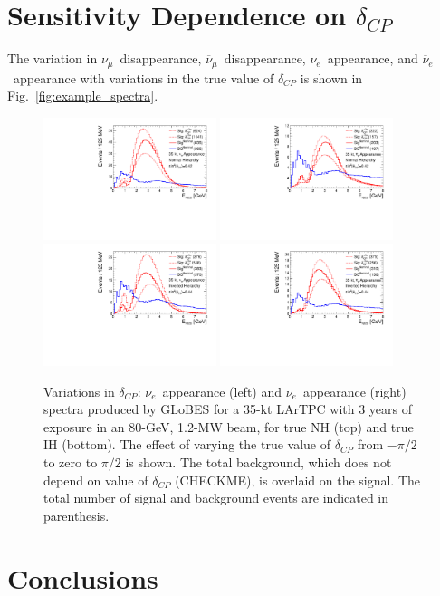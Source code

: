 \documentclass[letterpaper,11pt]{article}
\begin{document}
\section{Sensitivity Dependence on $\delta_{CP}$}
\label{sect:deltacp}
The variation in $\nu_{\mu}$~disappearance, $\overline{\nu}_{\mu}$~disappearance, 
$\nu_e$~appearance, and $\overline{\nu}_e$~appearance with variations in the true
value of $\delta_{CP}$ is shown in Fig.~\ref{fig:example_spectra}.
\begin{figure}[!htb]
  \centering
  \includegraphics[width=0.45\textwidth]{figs/spectra_35kt_nue_dcpvar_nh.pdf}
  \includegraphics[width=0.45\textwidth]{figs/spectra_35kt_nuebar_dcpvar_nh.pdf}
  \includegraphics[width=0.45\textwidth]{figs/spectra_35kt_nue_dcpvar_ih.pdf}
  \includegraphics[width=0.45\textwidth]{figs/spectra_35kt_nuebar_dcpvar_ih.pdf}
  \caption{
  Variations in $\delta_{CP}$:
  $\nu_e$~appearance (left) and $\overline{\nu}_e$~appearance (right) spectra 
  produced by GLoBES for a 35-kt LArTPC with 3 years of 
  exposure in an 80-GeV, 1.2-MW beam, for true NH (top) and true IH (bottom). 
  The effect of varying the true
  value of $\delta_{CP}$ from $-\pi/2$ to zero to $\pi/2$ is shown.
  The total background, which does not depend on value of $\delta_{CP}$ (CHECKME), 
  is overlaid on the signal. The total number
  of signal and background events are indicated in parenthesis.}
  \label{fig:dcpspec}
\end{figure}

\section{Conclusions}
\label{sect:conclude}



\end{document}
